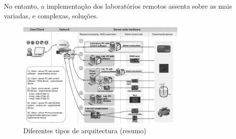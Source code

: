 No entanto, a implementação dos laboratórios remotos assenta sobre as mais variadas, e complexas, soluções. 
\begin{figure}[hbtp]
    \centering
    \includegraphics[width=0.75\textwidth]{figures/kaluz.png}
    \caption{Diferentes tipos de arquitectura (resumo)}
    \label{fig:diferentestiposarq}
\end{figure}

